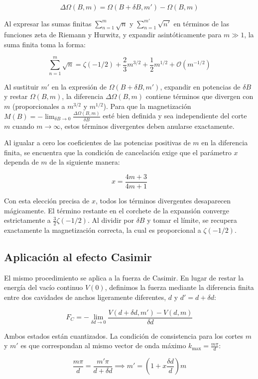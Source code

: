 $$ \Delta\Omega(B, m) = \Omega(B + \delta B, m') - \Omega(B, m) $$

Al expresar las sumas finitas $\sum_{n=1}^m \sqrt{n}$ y $\sum_{n=1}^{m'} \sqrt{n'}$ en términos de las funciones zeta de Riemann y Hurwitz, y expandir asintóticamente para $m \gg 1$, la suma finita toma la forma:

$$ \sum_{n=1}^m \sqrt{n} = \zeta(-1/2) + \frac{2}{3}m^{3/2} + \frac{1}{2}m^{1/2} + \mathcal{O}(m^{-1/2}) $$

Al sustituir $m'$ en la expresión de $\Omega(B + \delta B, m')$, expandir en potencias de $\delta B$ y restar $\Omega(B, m)$, la diferencia $\Delta\Omega(B, m)$ contiene términos que divergen con $m$ (proporcionales a $m^{3/2}$ y $m^{1/2}$). Para que la magnetización $M(B) = -\lim_{\delta B \to 0} \frac{\Delta\Omega(B, m)}{\delta B}$ esté bien definida y sea independiente del corte $m$ cuando $m \to \infty$, estos términos divergentes deben anularse exactamente.

Al igualar a cero los coeficientes de las potencias positivas de $m$ en la diferencia finita, se encuentra que la condición de cancelación exige que el parámetro $x$ dependa de $m$ de la siguiente manera:

$$ x = \frac{4m + 3}{4m + 1} $$

Con esta elección precisa de $x$, todos los términos divergentes desaparecen mágicamente. El término restante en el corchete de la expansión converge estrictamente a $\frac{3}{2}\zeta(-1/2)$. Al dividir por $\delta B$ y tomar el límite, se recupera exactamente la magnetización correcta, la cual es proporcional a $\zeta(-1/2)$. 

\subsection{Aplicación al efecto Casimir}

El mismo procedimiento se aplica a la fuerza de Casimir. En lugar de restar la energía del vacío continuo $V(0)$, definimos la fuerza mediante la diferencia finita entre dos cavidades de anchos ligeramente diferentes, $d$ y $d' = d + \delta d$:

$$ F_C = - \lim_{\delta d \to 0} \frac{V(d + \delta d, m') - V(d, m)}{\delta d} $$

Ambos estados están cuantizados. La condición de consistencia para los cortes $m$ y $m'$ es que correspondan al mismo vector de onda máximo $k_{\text{max}} = \frac{m\pi}{d}$:

$$ \frac{m\pi}{d} = \frac{m'\pi}{d + \delta d} \implies m' = \left(1 + x \frac{\delta d}{d}\right) m $$

